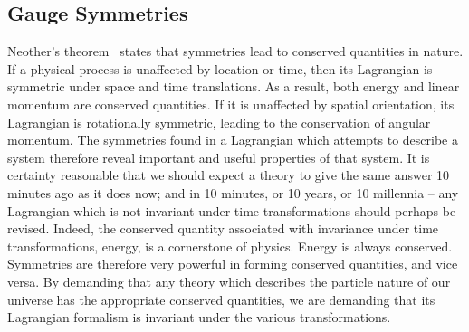 \subsection{Gauge Symmetries \label{th:gauge}}
Neother's theorem~\cite{bib:Noether1918} states that symmetries lead to conserved quantities in nature.
If a physical process is unaffected by location or time, then its Lagrangian is symmetric under space and time translations.
As a result, both energy and linear momentum are conserved quantities.
If it is unaffected by spatial orientation, its Lagrangian is rotationally symmetric, leading to the conservation of angular momentum.
The symmetries found in a Lagrangian which attempts to describe a system therefore reveal important and useful properties of that system.
It is certainty reasonable that we should expect a theory to give the same answer 10 minutes ago as it does now; and in 10 minutes, or 10 years, or 10 millennia -- any Lagrangian which is not invariant under time transformations should perhaps be revised.
Indeed, the conserved quantity associated with invariance under time transformations, energy, is a cornerstone of physics. 
Energy is always conserved.
Symmetries are therefore very powerful in forming conserved quantities, and vice versa.
By demanding that any theory which describes the particle nature of our universe has the appropriate conserved quantities, we are demanding that its Lagrangian formalism is invariant under the various transformations.

